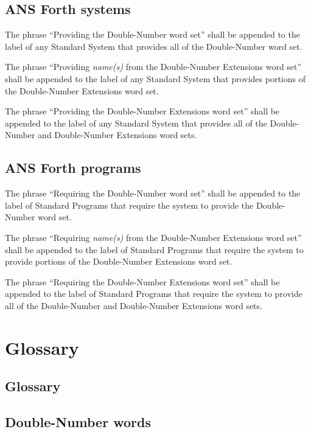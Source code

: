 \subsection{ANS Forth systems} %

The phrase ``Providing the Double-Number word set'' shall be
appended to the label of any Standard System that provides all
of the Double-Number word set.

The phrase ``Providing \emph{name(s)} from the Double-Number
Extensions word set'' shall be appended to the label of any
Standard System that provides portions of the Double-Number
Extensions word set.

The phrase ``Providing the Double-Number Extensions word set''
shall be appended to the label of any Standard System that
provides all of the Double-Number and Double-Number Extensions
word sets.

\subsection{ANS Forth programs} %

The phrase ``Requiring the Double-Number word set'' shall be
appended to the label of Standard Programs that require the
system to provide the Double-Number word set.

The phrase ``Requiring \emph{name(s)} from the Double-Number
Extensions word set'' shall be appended to the label of Standard
Programs that require the system to provide portions of the
Double-Number Extensions word set.

The phrase ``Requiring the Double-Number Extensions word set''
shall be appended to the label of Standard Programs that require
the system to provide all of the Double-Number and Double-Number
Extensions word sets.

\section{Glossary} %

\begin{info}
\subsection{Glossary}
\end{info}

\subsection{Double-Number words} %

